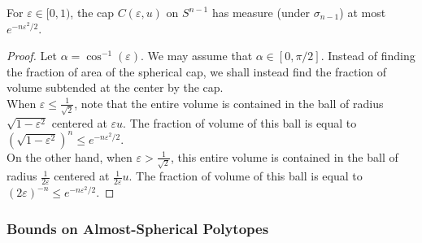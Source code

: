 \begin{lemma}
    \label{spherical cap upper bound}
    For $\varepsilon\in[0,1)$, the cap $C(\varepsilon,u)$ on $S^{n-1}$ has measure (under $\sigma_{n-1}$) at most $e^{-n\varepsilon^2/2}$.
\end{lemma}
\begin{proof}
    Let $\alpha=\cos^{-1}(\varepsilon)$. We may assume that $\alpha\in[0,\pi/2]$. Instead of finding the fraction of area of the spherical cap, we shall instead find the fraction of volume subtended at the center by the cap.\\
    When $\varepsilon\leq\frac{1}{\sqrt{2}}$, note that the entire volume is contained in the ball of radius $\sqrt{1-\varepsilon^2}$ centered at $\varepsilon u$. The fraction of volume of this ball is equal to $\left(\sqrt{1-\varepsilon^2}\right)^n\leq e^{-n\varepsilon^2/2}$.\\
    On the other hand, when $\varepsilon>\frac{1}{\sqrt{2}}$, this entire volume is contained in the ball of radius $\frac{1}{2\varepsilon}$ centered at $\frac{1}{2\varepsilon} u$. The fraction of volume of this ball is equal to $(2\varepsilon)^{-n} \leq e^{-n\varepsilon^2/2}$.
\end{proof}

\subsubsection{Bounds on Almost-Spherical Polytopes}

